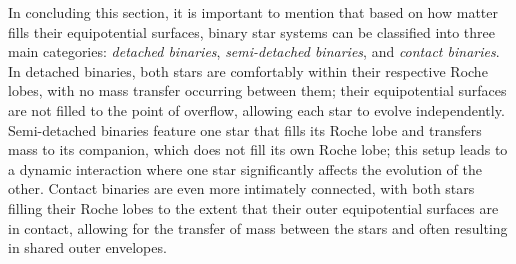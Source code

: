 \documentclass[main.tex]{subfiles}
\begin{document}
    In concluding this section, it is important to mention that based on how matter fills their equipotential surfaces, binary star systems can be classified into three main categories: \textit{detached binaries}, \textit{semi-detached binaries}, and \textit{contact binaries}. In detached binaries, both stars are comfortably within their respective Roche lobes, with no mass transfer occurring between them; their equipotential surfaces are not filled to the point of overflow, allowing each star to evolve independently. Semi-detached binaries feature one star that fills its Roche lobe and transfers mass to its companion, which does not fill its own Roche lobe; this setup leads to a dynamic interaction where one star significantly affects the evolution of the other. Contact binaries are even more intimately connected, with both stars filling their Roche lobes to the extent that their outer equipotential surfaces are in contact, allowing for the transfer of mass between the stars and often resulting in shared outer envelopes.
\end{document}
